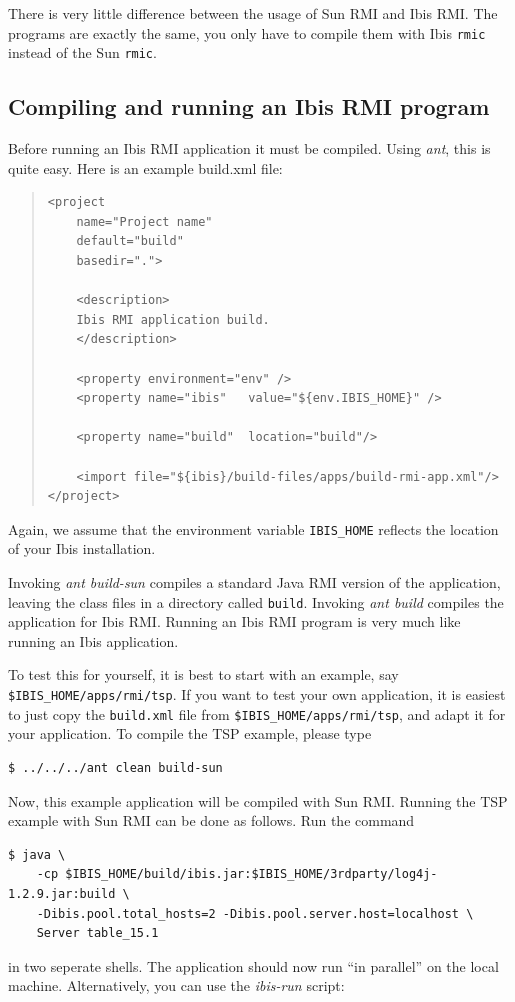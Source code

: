 \documentclass[10pt]{article}
\newcommand{\mysubsection}[1]{\subsection{#1}\label{#1}}
\newcommand{\remark}[1]{[\emph{#1}]}
\begin{document}
There is very little difference between the usage of Sun RMI and Ibis
RMI. The programs are exactly the same, you only have to compile them
with Ibis \texttt{rmic} instead of the Sun \texttt{rmic}. 



\mysubsection{Compiling and running an Ibis RMI program}

Before running an Ibis RMI application it must be compiled.
Using \emph{ant}, this is quite easy. Here is an example build.xml file:

\begin{quote}
\begin{verbatim}
<project
    name="Project name"
    default="build"
    basedir=".">

    <description>
    Ibis RMI application build.
    </description>

    <property environment="env" />
    <property name="ibis"   value="${env.IBIS_HOME}" />

    <property name="build"  location="build"/>

    <import file="${ibis}/build-files/apps/build-rmi-app.xml"/>
</project>
\end{verbatim}
\end{quote}

Again, we assume that the environment variable \texttt{IBIS\_HOME} reflects
the location of your Ibis installation.

Invoking \emph{ant build-sun} compiles a standard Java RMI version of
the application, leaving the class files in a directory called \texttt{build}.
Invoking \emph{ant build} compiles the application for Ibis RMI.
Running an Ibis RMI program is very much like running an Ibis application.

To test this for yourself, it is best to start with
an example, say \texttt{\$IBIS\_HOME/apps/rmi/tsp}. 
If you want to test your own application, it is easiest to just copy
the \texttt{build.xml} file from \texttt{\$IBIS\_HOME/apps/rmi/tsp}, and adapt it for your
application. 
To compile the TSP example, please type
\begin{verbatim}
$ ../../../ant clean build-sun
\end{verbatim}
\noindent
Now, this example application will be compiled with Sun RMI.
Running the TSP example with Sun RMI can be done as follows. Run the command
\begin{verbatim}
$ java \
    -cp $IBIS_HOME/build/ibis.jar:$IBIS_HOME/3rdparty/log4j-1.2.9.jar:build \
    -Dibis.pool.total_hosts=2 -Dibis.pool.server.host=localhost \
    Server table_15.1
\end{verbatim}
\noindent
in two seperate shells. The application should now run ``in parallel''
on the local machine. Alternatively, you can use the \emph{ibis-run} script:
\end{document}
